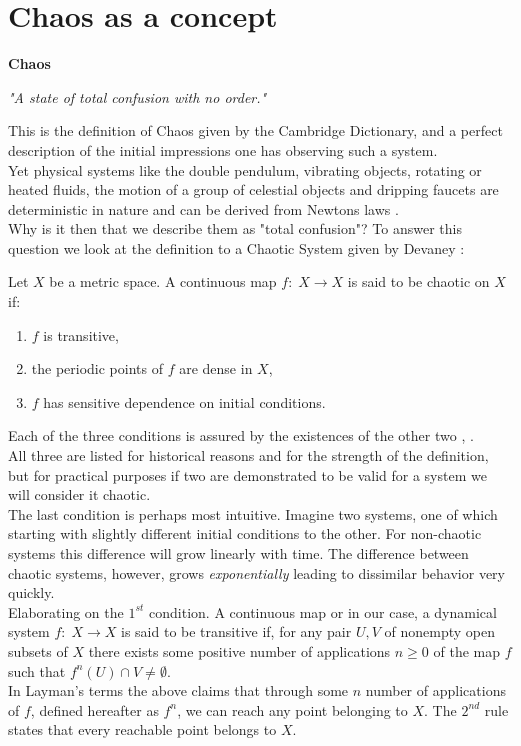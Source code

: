 \section{Chaos as a concept}
\vspace{0.3in}
\begin{center}
    \textbf{Chaos}

    \textit{"A state of total confusion with no order."}
\end{center}

This is the definition of Chaos given by the Cambridge Dictionary, and
a perfect description of the initial impressions one has observing such a system.\\
Yet physical systems like the double pendulum, vibrating objects, 
rotating or heated fluids, the motion of a group of celestial objects and dripping faucets
are deterministic in nature and can be derived from Newtons laws \cite{baker}.\\
Why is it then that we describe them as "total confusion"? To answer this question we look at
the definition to a Chaotic System given by Devaney \cite{devaney}:

\begin{center}
    Let $X$ be a metric space. A continuous map $f:\; X\to X$ is said to be
    chaotic on $X$ if:
\end{center}   

\begin{enumerate}
    \item $f$ is transitive,
    \item the periodic points of $f$ are dense in $X$,
    \item $f$ has sensitive dependence on initial conditions.
\end{enumerate}

Each of the three conditions is assured by the existences of the other two \cite{banks}, \cite{crannell}.\\
All three are listed for historical reasons and for the strength of the definition, but 
for practical purposes if two are demonstrated to be valid for a system we will
consider it chaotic.\\
The last condition is perhaps most intuitive. Imagine two systems, one of which starting with
slightly different initial conditions to the other. For non-chaotic systems this difference will 
grow linearly with time. The difference between chaotic systems, however, grows \textit{exponentially}
leading to dissimilar behavior very quickly. \\
Elaborating on the $1^{st}$ condition. A continuous map or in our case, a dynamical system
$f:\; X\to X$ is said to be transitive if, for any pair $U, V$ of nonempty open subsets of $X$
there exists some positive number of applications $n\geq 0$ of the map $f$ such that
$f^n(U)\cap V \neq \emptyset$. \cite{erdmann} \\
In Layman's terms the above claims that through some $n$ number of applications of $f$, defined hereafter as $f^n$, we can reach any
point belonging to $X$. The $2^{nd}$ rule states that every reachable point belongs to $X$.
